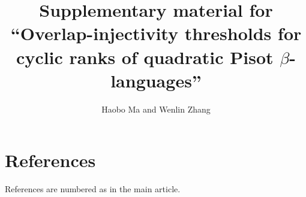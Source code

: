 \documentclass[12pt,a4paper]{article}
\title{Supplementary material for ``Overlap-injectivity thresholds for cyclic
ranks of quadratic Pisot $\beta$-languages''}
\author{Haobo Ma and Wenlin Zhang}
\date{}
\theoremstyle{definition}
\theoremstyle{plain}
\theoremstyle{remark}
\numberwithin{equation}{section}
\begin{document}
\maketitle
\appendix







\section*{References}
References are numbered as in the main article.
\end{document}
